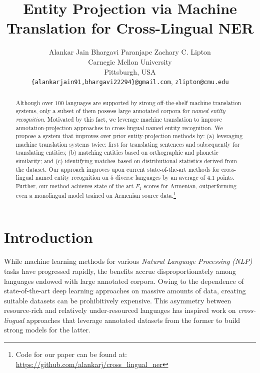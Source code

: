 \documentclass[11pt,a4paper]{article}
\title{Entity Projection via Machine Translation for Cross-Lingual NER
}
\author{Alankar Jain \qquad Bhargavi Paranjape \qquad Zachary C. Lipton \\ 
Carnegie Mellon University \\
Pittsburgh, USA \\
{\tt \{alankarjain91,bhargavi22294\}@gmail.com}, {\tt zlipton@cmu.edu}}
\date{}
\begin{document}
\maketitle

\begin{abstract}
    Although over $100$ languages are supported by strong off-the-shelf machine translation systems, 
only a subset of them possess large annotated corpora for \emph{named entity recognition}.
Motivated by this fact, we leverage machine translation 
to improve annotation-projection approaches to cross-lingual named entity recognition. 
We propose a system that improves over prior entity-projection methods by:
(a) leveraging machine translation systems twice: 
first for translating sentences and subsequently for translating entities;
(b) matching entities based on orthographic and phonetic similarity; and 
(c) identifying matches based on distributional statistics derived from the dataset. 
Our approach improves upon current state-of-the-art methods
for cross-lingual named entity recognition 
on $5$ diverse languages by an average of $4.1$ points. 
Further, our method achieves state-of-the-art $F_1$ scores for 
Armenian, outperforming even a monolingual model
trained on Armenian source data.\footnote{Code for our paper can be found at: 
\url{https://github.com/alankarj/cross_lingual_ner}} \end{abstract}

\section{Introduction}
\label{sec:intro}

While machine learning methods for various 
\emph{Natural Language Processing (NLP)} tasks 
have progressed rapidly,
the benefits
accrue disproportionately 
among languages
endowed with large annotated corpora.
Owing to the dependence of state-of-the-art deep learning approaches 
on massive amounts of data,
creating suitable datasets can be prohibitively expensive. 
This asymmetry between resource-rich and 
relatively under-resourced languages
has inspired work on \emph{cross-lingual} approaches 
that leverage annotated datasets from the former
to build strong models for the latter. 
\end{document}
